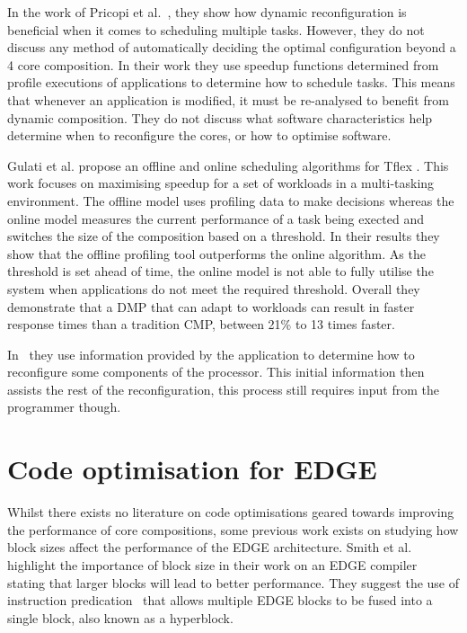 In the work of Pricopi et al.~\cite{pricopiSchedCoreComp2014}, they show how dynamic reconfiguration is beneficial when it comes to scheduling multiple tasks.
However, they do not discuss any method of automatically deciding the optimal configuration beyond a 4 core composition.
In their work they use speedup functions determined from profile executions of applications to determine how to schedule tasks.
This means that whenever an application is modified, it must be re-analysed to benefit from dynamic composition.
They do not discuss what software characteristics help determine when to reconfigure the cores, or how to optimise software.

Gulati et al. propose an offline and online scheduling algorithms for Tflex \cite{gulati2008multitaskingdmc}. 
This work focuses on maximising speedup for a set of workloads in a multi-tasking environment.
The offline model uses profiling data to make decisions whereas the online model measures the current performance of a task being exected and switches the size of the composition based on a threshold.
In their results they show that the offline profiling tool outperforms the online algorithm.
As the threshold is set ahead of time, the online model is not able to fully utilise the system when applications do not meet the required threshold.
Overall they demonstrate that a DMP that can adapt to workloads can result in faster response times than a tradition CMP, between 21\% to 13 times faster.

In~\cite{santos2013nocdmc} they use information provided by the application to determine how to reconfigure some components of the processor.
This initial information then assists the rest of the reconfiguration, this process still requires input from the programmer though.

\section{Code optimisation for EDGE}

Whilst there exists no literature on code optimisations geared towards improving the performance of core compositions, some previous work exists on studying how block sizes affect the performance of the EDGE architecture.
Smith et al. highlight the importance of block size in their work on an EDGE compiler ~\cite{smith2006edge} stating that larger blocks will lead to better performance.
They suggest the use of instruction predication~\cite{smith2006dataflowpred} that allows multiple EDGE blocks to be fused into a single block, also known as a hyperblock.

